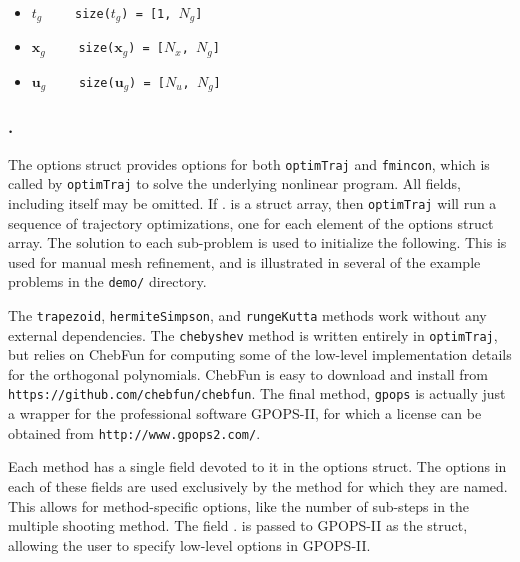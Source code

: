 \begin{itemize} \setlength\itemsep{-0.1em}
\item {}\tc{ = }$t_g \qquad$ \texttt{size($t_g$) = [1, $N_g$]}   
\item {}\tc{ = }$\bm{x}_g \qquad$ \texttt{size($\bm{x}_g$) = [$N_x$, $N_g$]}  
\item {}\tc{ = }$\bm{u}_g \qquad$ \texttt{size($\bm{u}_g$) = [$N_u$, $N_g$]}
\end{itemize}



\subsubsection*{.}

The options struct provides options for both \texttt{optimTraj} and \texttt{fmincon}, which is called by \texttt{optimTraj} to solve the underlying nonlinear program. All fields, including  itself may be omitted. If . is a struct array, then \texttt{optimTraj} will run a sequence of trajectory optimizations, one for each element of the options struct array. The solution to each sub-problem is used to initialize the following. This is used for manual mesh refinement, and is illustrated in several of the example problems in the \texttt{demo/} directory. 

\par The \texttt{trapezoid}, \texttt{hermiteSimpson}, and \texttt{rungeKutta} methods work without any external dependencies. The \texttt{chebyshev} method is written entirely in \texttt{optimTraj}, but relies on ChebFun\cite{Driscoll2014} for computing some of the low-level implementation details for the orthogonal polynomials. ChebFun is easy to download and install from \texttt{https://github.com/chebfun/chebfun}. The final method, \texttt{gpops} is actually just a wrapper for the professional software GPOPS-II\cite{Patterson2013}, for which a license can be obtained from \texttt{http://www.gpops2.com/}.

\par Each method has a single field devoted to it in the options struct. The options in each of these fields are used exclusively by the method for which they are named. This allows for method-specific options, like the number of sub-steps in the multiple shooting method. The field . is passed to GPOPS-II as the  struct, allowing the user to specify low-level options in GPOPS-II. 

